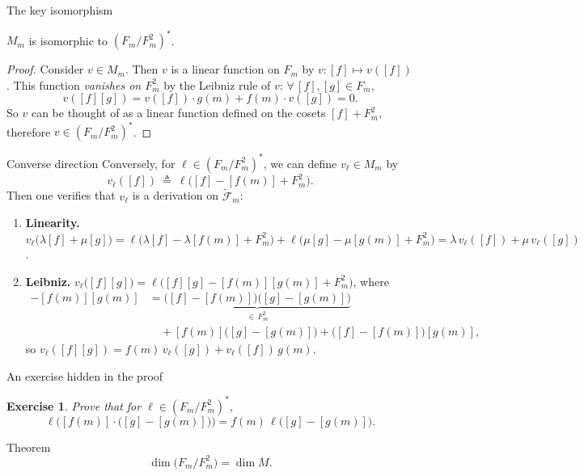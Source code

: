\documentclass[10pt]{beamer}
\newtheorem{exercise}{Exercise}
\newcommand{\F}{\mathcal{F}}
\begin{document}
\begin{frame}{The key isomorphism}
	\begin{lemma}
		$M_m$ is isomorphic to $(F_m / F_m^2)^*$.
	\end{lemma}
	\begin{proof}
		Consider $v \in M_m$. Then $v$ is a linear function on $F_m$ by
		$v : [f] \mapsto v([f])$. This function \emph{vanishes on $F_m^2$}
		by the Leibniz rule of $v$: $\forall\, [f], [g] \in F_m$,
		\[
			v([f][g]) = v([f]) \cdot g(m) + f(m) \cdot v([g]) = 0.
		\]
		So $v$ can be thought of as a linear function defined on the
		cosets $[f] + F_m^2$, therefore $v \in (F_m/F_m^2)^*$.
	\end{proof}
\end{frame}

\begin{frame}{Converse direction}
	Conversely, for $\ell \in (F_m / F_m^2)^*$, we can define
	$v_\ell \in M_m$ by
	\[
		v_\ell([f]) \ \triangleq\
		\ell\bigl( [f] - [f(m)] + F_m^2 \bigr).
	\]
	Then one verifies that $v_\ell$ is a derivation on
	$\widetilde{\F}_m$:
	\begin{enumerate}
		\item \textbf{Linearity.}
		      $v_\ell\bigl(\lambda[f] + \mu[g]\bigr)
		      = \ell\bigl( \lambda[f] - \lambda[f(m)] + F_m^2 \bigr)
		      + \ell\bigl( \mu[g] - \mu[g(m)] + F_m^2 \bigr)
		      = \lambda\, v_\ell([f]) + \mu\, v_\ell([g])$.
		\item \textbf{Leibniz.}
		      $v_\ell\bigl([f][g]\bigr)
		      = \ell\bigl( [f][g] - [f(m)][g(m)] + F_m^2 \bigr)$,
		      where
		      \begin{align*}
			      [f][g] - [f(m)][g(m)]
			      & = \underbrace{\bigl([f]-[f(m)]\bigr)\bigl([g]-[g(m)]\bigr)}_{\in\, F_m^2} \\
			      & \quad + [f(m)]\bigl([g]-[g(m)]\bigr)
			      + \bigl([f]-[f(m)]\bigr)[g(m)],
		      \end{align*}
		      so $v_\ell([f][g]) = f(m)\, v_\ell([g]) + v_\ell([f])\, g(m)$.
	\end{enumerate}
\end{frame}

\begin{frame}{An exercise hidden in the proof}
	\begin{exercise}
		Prove that for $\ell \in (F_m / F_m^2)^*$,
		\[
			\ell\bigl( [f(m)]\cdot\bigl([g]-[g(m)]\bigr) \bigr)
			= f(m)\, \ell\bigl( [g] - [g(m)] \bigr).
		\]
	\end{exercise}
	\bigskip
	\begin{alertblock}{Theorem}
		\[
			\dim\bigl(F_m / F_m^2\bigr) = \dim M.
		\]
	\end{alertblock}
\end{frame}
\end{document}
